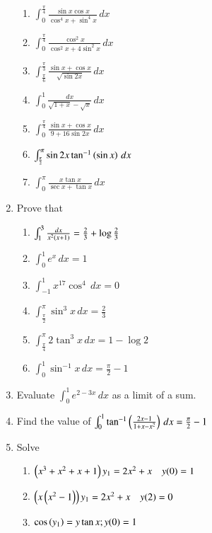 \begin{enumerate}[label=\arabic*.,ref=\thesubsection.\theenumi]
\begin{enumerate}[label = (\roman*)]
\item 
%
$
\int_{0}^{\frac{\pi}{4}}\frac{\sin x\cos x}{\cos^4 x + \sin^4 x}\,dx
$
\item 
%
$
\int_{0}^{\frac{\pi}{4}}\frac{\cos^2 x}{\cos^2 x + 4\sin^2 x}\,dx
$
\item 
%
$
\int_{\frac{\pi}{6}}^{\frac{\pi}{3}}\frac{\sin x+\cos x}{\sqrt{\sin 2x}}\,dx
$
\item 
%
$
\int_{0}^{1}\frac{dx}{\sqrt{1+x}-\sqrt{x}}\,dx
$
\item 
%
$
\int_{0}^{\frac{\pi}{4}}\frac{\sin x + \cos x}{9 + 16\sin 2 x}\,dx
$
\item $\int_{\frac{\pi}{2}}^{\pi}\sin 2x \tan^{-1}\left(\sin x\right)\, dx$
\item 
%
$
\int_{0}^{\pi}\frac{x\tan x}{\sec x + \tan x}\,dx
$
\end{enumerate}
\item Prove that
%
\begin{enumerate}[label = (\roman*)]
\item $\int_{1}^{3}\frac{dx}{x^2\left(x+1\right)} = \frac{2}{3}+\log \frac{2}{3}$
\item $\int_{0}^{1}e^x\,dx = 1$
\item $\int_{-1}^{1}x^{17}\cos^4\,dx = 0$
\item $\int_{\frac{\pi}{2}}^{\pi}\sin^ 3x \, dx = \frac{2}{3}$
\item $\int_{\frac{\pi}{4}}^{\pi}2\tan^ 3x \, dx = 1-\log 2$
\item $\int_{0}^{1}\sin^{-1}x\,dx = \frac{\pi}{2}-1$
\end{enumerate}
\item Evaluate  $\int_{0}^{1}e^{2-3x}\,dx$ as a limit of a sum.
\item Find the value of $\int_{0}^{1}\tan^{-1}\left(\frac{2x-1}{1+x-x^2}\right)\,dx = \frac{\pi}{2}-1$
\item Solve
%
\begin{enumerate}[label = (\roman*)]
\item  $\left(x^3+x^2+x+1\right)y_1 = 2x^2+x \quad y(0) = 1 $
\item  $\left(x\left(x^2-1\right)\right)y_1 = 2x^2+x \quad y(2) = 0 $
\item $\cos \left(y_1\right) = y\tan x; y(0) = 1$


\end{enumerate}
\end{enumerate}
